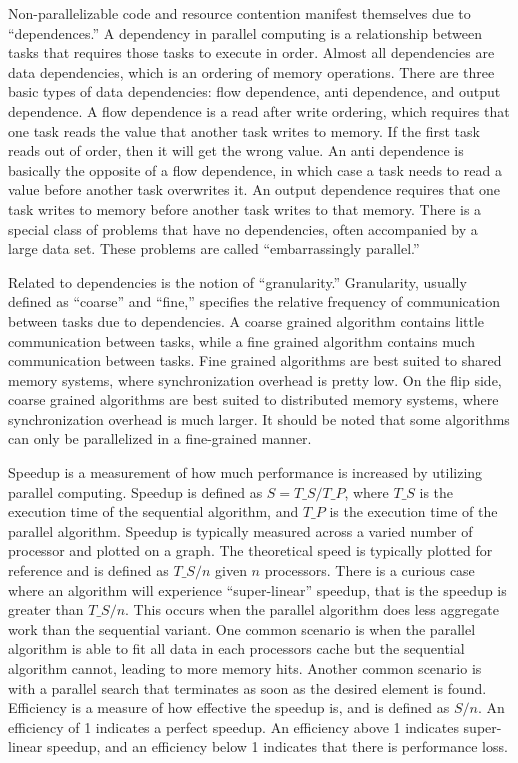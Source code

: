 Non-parallelizable code and resource contention manifest themselves due to ``dependences.'' A dependency in parallel computing is a relationship between tasks that requires those tasks to execute in order. Almost all dependencies are data dependencies, which is an ordering of memory operations. There are three basic types of data dependencies: flow dependence, anti dependence, and output dependence. A flow dependence is a read after write ordering, which requires that one task reads the value that another task writes to memory. If the first task reads out of order, then it will get the wrong value. An anti dependence is basically the opposite of a flow dependence, in which case a task needs to read a value before another task overwrites it. An output dependence requires that one task writes to memory before another task writes to that memory. There is a special class of problems that have no dependencies, often accompanied by a large data set. These problems are called ``embarrassingly parallel.'' \cite{ref:2009-snyder-principles_of_parallel_programming}

Related to dependencies is the notion of ``granularity.'' Granularity, usually defined as ``coarse'' and ``fine,'' specifies the relative frequency of communication between tasks due to dependencies. A coarse grained algorithm contains little communication between tasks, while a fine grained algorithm contains much communication between tasks. Fine grained algorithms are best suited to shared memory systems, where synchronization overhead is pretty low. On the flip side, coarse grained algorithms are best suited to distributed memory systems, where synchronization overhead is much larger. It should be noted that some algorithms can only be parallelized in a fine-grained manner. \cite{ref:2009-snyder-principles_of_parallel_programming}

Speedup is a measurement of how much performance is increased by utilizing parallel computing. Speedup is defined as $S=T\_S/T\_P$, where $T\_S$ is the execution time of the sequential algorithm, and $T\_P$ is the execution time of the parallel algorithm. Speedup is typically measured across a varied number of processor and plotted on a graph. The theoretical speed is typically plotted for reference and is defined as $T\_S/n$ given $n$ processors. There is a curious case where an algorithm will experience ``super-linear'' speedup, that is the speedup is greater than $T\_S/n$. This occurs when the parallel algorithm does less aggregate work than the sequential variant. One common scenario is when the parallel algorithm is able to fit all data in each processors cache but the sequential algorithm cannot, leading to more memory hits. Another common scenario is with a parallel search that terminates as soon as the desired element is found. Efficiency is a measure of how effective the speedup is, and is defined as $S/n$. An efficiency of 1 indicates a perfect speedup. An efficiency above 1 indicates super-linear speedup, and an efficiency below 1 indicates that there is performance loss. \cite{ref:2009-snyder-principles_of_parallel_programming}

